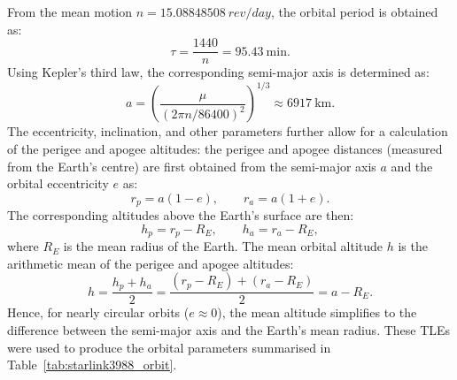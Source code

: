 \documentclass{article}
\begin{document}
From the mean motion \(n = 15.08848508~\si{rev/day}\), the orbital period is obtained as:
\[
\tau = \frac{1440}{n} = \SI{95.43}{\minute}.
\]
Using Kepler’s third law, the corresponding semi-major axis is determined as:
\[
a = \left(\frac{\mu}{(2\pi n / 86400)^{2}}\right)^{1/3} \approx \SI{6917}{\kilo\metre}.
\]
The eccentricity, inclination, and other parameters further allow for a calculation of the perigee and apogee altitudes:  the perigee and apogee distances (measured from the Earth's centre) are first obtained from the semi-major axis \(a\) and the orbital eccentricity \(e\) as:
\[
r_{p} = a(1 - e),
\qquad
r_{a} = a(1 + e).
\]
The corresponding altitudes above the Earth's surface are then:
\[
h_{p} = r_{p} - R_{E},
\qquad
h_{a} = r_{a} - R_{E},
\]
where \(R_{E}\) is the mean radius of the Earth. The mean orbital altitude \(h\) is the arithmetic mean of the perigee and apogee altitudes:
\[
h = \frac{h_{p} + h_{a}}{2}
    = \frac{(r_{p} - R_{E}) + (r_{a} - R_{E})}{2}
    = a - R_{E}.
\]
Hence, for nearly circular orbits (\(e \approx 0\)), the mean altitude simplifies to the difference between the semi-major axis and the Earth's mean radius. These TLEs were used to produce the orbital parameters summarised in Table~\ref{tab:starlink3988_orbit}.
\end{document}
